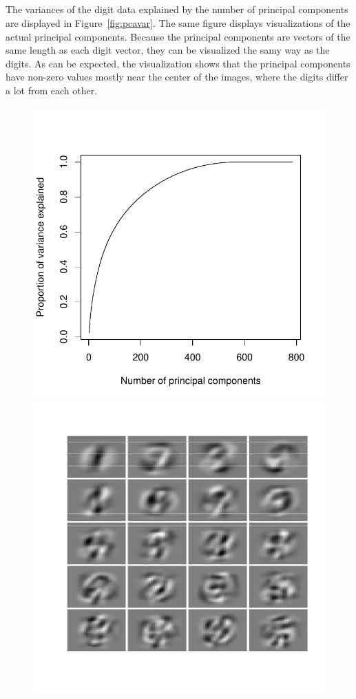\documentclass{article}
\begin{document}
\subsection{}
The variances of the digit data explained by the number of principal components are displayed in Figure~\ref{fig:pcavar}.
The same figure displays visualizations of the actual principal components.
Because the principal components are vectors of the same length as each digit vector, they can be visualized the samy way as the digits.
As can be expected, the visualization shows that the principal components have non-zero values mostly near the center of the images, where the digits differ a lot from each other.
\begin{figure}\centering
	\includegraphics[scale=0.6]{pcavar}
	\includegraphics[scale=0.4]{pcanums}

\end{figure}
\end{document}
